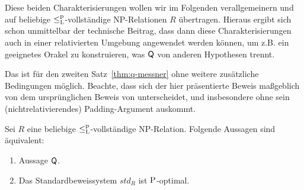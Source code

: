 Diese beiden Charakterisierungen wollen wir im Folgenden verallgemeinern und auf beliebige $\leqlp$-vollständige NP-Relationen $R$ übertragen. 
Hieraus ergibt sich schon unmittelbar der technische Beitrag, dass dann diese Charakterisierungen auch in einer relativierten Umgebung angewendet werden können, um z.B. ein geeignetes Orakel zu konstruieren, was $\hQ$ von anderen Hypothesen trennt.

Das ist für den zweiten Satz~\ref{thm:q-messner} ohne weitere zusätzliche Bedingungen möglich. Beachte, dass sich der hier präsentierte Beweis maßgeblich von dem ursprünglichen Beweis von \textcite[vgl.][Thm.~5.2]{messner_simulation_2001} unterscheidet, und insbesondere ohne sein (nichtrelativierendes) Padding-Argument auskommt.
\begin{theorem}\label{thm:q-messner-generalized}
    Sei $R$ eine beliebige $\leqlp$-vollständige NP-Relation.
    Folgende Aussagen sind äquivalent:
    \begin{enumerate}
        \item Aussage $\hQ$.
        \item Das Standardbeweissystem $\mathit{std}_R$ ist $\P$-optimal.
    \end{enumerate}
\end{theorem}
